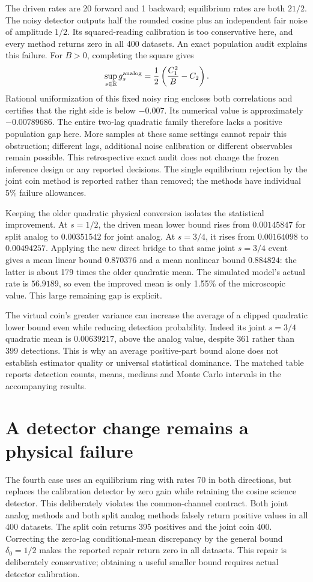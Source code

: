 The driven rates are 20 forward and 1 backward; equilibrium rates are both
$21/2$. The noisy detector outputs half the rounded cosine plus an independent
fair noise of amplitude $1/2$. Its squared-reading calibration is too
conservative here, and every method returns zero in all 400 datasets.
An exact population audit explains this failure. For $B>0$, completing the
square gives
\[
 \sup_{s\in\mathbb R}g_s^{\rm analog}
 =\frac12\left(\frac{C_1^2}{B}-C_2\right).
\]
Rational uniformization of this fixed noisy ring encloses both correlations
and certifies that the right side is below $-0.007$. Its numerical value is
approximately $-0.00789686$. The entire two-lag quadratic family therefore
lacks a positive population gap here. More samples at these same settings
cannot repair this obstruction; different lags, additional noise calibration
or different observables remain possible. This retrospective exact audit does
not change the frozen inference design or any reported decisions.
The single equilibrium rejection by the joint coin method is reported rather
than removed; the methods have individual 5\% failure allowances.

Keeping the older quadratic physical conversion isolates the statistical
improvement. At $s=1/2$, the driven mean lower bound rises from $0.00145847$
for split analog to $0.00351542$ for joint analog. At $s=3/4$, it rises from
$0.00164098$ to $0.00494257$. Applying the new direct bridge to that same
joint $s=3/4$ event gives a mean linear bound $0.870376$ and a mean nonlinear
bound $0.884824$: the latter is about 179 times the older quadratic mean.
The simulated model's actual rate is $56.9189$, so even the improved mean is
only 1.55\% of the microscopic value. This large remaining gap is explicit.

The virtual coin's greater variance can increase the average of a clipped
quadratic lower bound even while reducing detection probability. Indeed its
joint $s=3/4$ quadratic mean is $0.00639217$, above the analog value, despite
361 rather than 399 detections. This is why an average positive-part bound
alone does not establish estimator quality or universal statistical dominance.
The matched table reports detection counts, means, medians and Monte Carlo
intervals in the accompanying results.

\section{A detector change remains a physical failure}
The fourth case uses an equilibrium ring with rates 70 in both directions,
but replaces the calibration detector by zero gain while retaining the cosine
science detector. This deliberately violates the common-channel contract.
Both joint analog methods and both split analog methods falsely return positive
values in all 400 datasets. The split coin returns 395 positives and the joint
coin 400. Correcting the zero-lag conditional-mean discrepancy by the general
bound $\delta_0=1/2$ makes the reported repair return zero in all datasets.
This repair is deliberately conservative; obtaining a useful smaller bound
requires actual detector calibration.


